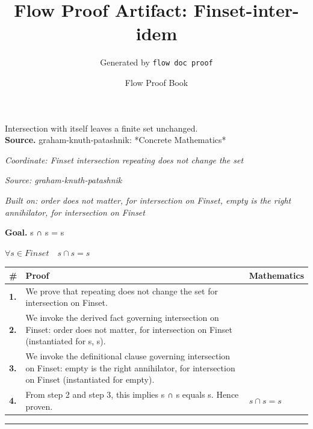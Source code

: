 \documentclass[11pt]{article}
\title{Flow Proof Artifact: Finset-inter-idem}
\author{Generated by \texttt{flow doc proof}}
\date{Flow Proof Book}
\theoremstyle{definition}
\begin{document}
\maketitle
Intersection with itself leaves a finite set unchanged.\\[0.5em]
\textbf{Source.} graham-knuth-patashnik: *Concrete Mathematics*\\[0.5em]
\bigskip
{}\par
\smallskip\noindent\textit{Coordinate: Finset \cdot intersection \cdot repeating does not change the set}\par
\smallskip\noindent\textit{Source: graham-knuth-patashnik}\par
\smallskip\noindent\textit{Built on: order does not matter, for intersection on Finset, empty is the right annihilator, for intersection on Finset}\par
\medskip
\noindent\textbf{Goal.} s ∩ s = s\par
\noindent$\displaystyle \forall s \in Finset\quad s ∩ s = s$\par
\medskip
\noindent
\begin{tabular}{@{} >{\raggedright\arraybackslash}p{} >{\raggedright\arraybackslash}p{} >{\raggedleft\arraybackslash}p{} @{}}
\textbf{\#} & \textbf{Proof} & \textbf{Mathematics} \\
\midrule
\textbf{1.} & We prove that repeating does not change the set for intersection on Finset. & \\[0.45em]
\textbf{2.} & We invoke the derived fact governing intersection on Finset: order does not matter, for intersection on Finset (instantiated for s, s). & \\[0.45em]
\textbf{3.} & We invoke the definitional clause governing intersection on Finset: empty is the right annihilator, for intersection on Finset (instantiated for empty). & \\[0.45em]
\textbf{4.} & From step 2 and step 3, this implies s ∩ s equals s. Hence proven. & $\displaystyle s ∩ s = s$ \\[0.45em]
\bottomrule
\end{tabular}
\label{thm:Finset-intersection-repeating_does_not_change_the_set}
\par\medskip\hrule
\end{document}
